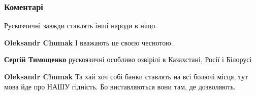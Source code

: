  
 
 
 
 
\subsubsection{Коментарі}
\label{sec:21_07_2021.fb.bryhar_sergej.1.mova_odessa_vokzal.cmt}

\begin{itemize}
 
Рускозчичні завжди ставлять інші народи в ніщо.

\begin{itemize}

 
\textbf{Oleksandr Chumak} І вважають це своєю чеснотою.

 
\textbf{Сергій Тимощенко} рускоязичні особливо озвірілі в Казахстані, Росії і Білорусі

 
\textbf{Oleksandr Chumak} Та хай хоч собі банки ставлять на всі болючі місця,
тут мова йде про НАШУ гідність. Бо виставляються вони там, де дозволяють.


\end{itemize}
\end{itemize}
